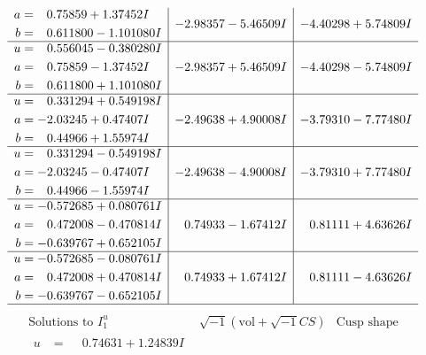 \documentclass[1p]{elsarticle_modified}
\theoremstyle{definition}
\newcommand{\I}{\sqrt{-1}}
\begin{document}
$$\begin{array}{c|c|c}
\begin{aligned}
a &= \phantom{-}0.75859 + 1.37452 I \\
b &= \phantom{-}0.611800 - 1.101080 I\end{aligned}
 & -2.98357 - 5.46509 I & -4.40298 + 5.74809 I \\ \hline\begin{aligned}
u &= \phantom{-}0.556045 - 0.380280 I \\
a &= \phantom{-}0.75859 - 1.37452 I \\
b &= \phantom{-}0.611800 + 1.101080 I\end{aligned}
 & -2.98357 + 5.46509 I & -4.40298 - 5.74809 I \\ \hline\begin{aligned}
u &= \phantom{-}0.331294 + 0.549198 I \\
a &= -2.03245 + 0.47407 I \\
b &= \phantom{-}0.44966 + 1.55974 I\end{aligned}
 & -2.49638 + 4.90008 I & -3.79310 - 7.77480 I \\ \hline\begin{aligned}
u &= \phantom{-}0.331294 - 0.549198 I \\
a &= -2.03245 - 0.47407 I \\
b &= \phantom{-}0.44966 - 1.55974 I\end{aligned}
 & -2.49638 - 4.90008 I & -3.79310 + 7.77480 I \\ \hline\begin{aligned}
u &= -0.572685 + 0.080761 I \\
a &= \phantom{-}0.472008 - 0.470814 I \\
b &= -0.639767 + 0.652105 I\end{aligned}
 & \phantom{-}0.74933 - 1.67412 I & \phantom{-}0.81111 + 4.63626 I \\ \hline\begin{aligned}
u &= -0.572685 - 0.080761 I \\
a &= \phantom{-}0.472008 + 0.470814 I \\
b &= -0.639767 - 0.652105 I\end{aligned}
 & \phantom{-}0.74933 + 1.67412 I & \phantom{-}0.81111 - 4.63626 I\\
 \hline 
 \end{array}$$\newpage$$\begin{array}{c|c|c}  
\text{Solutions to }I^u_{1}& \I (\text{vol} + \sqrt{-1}CS) & \text{Cusp shape}\\
 \hline 
\begin{aligned}
u &= \phantom{-}0.74631 + 1.24839 I \\

\end{aligned}
\end{array}$$
\end{document}
